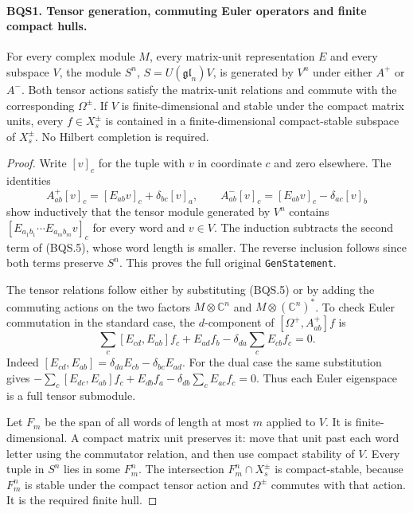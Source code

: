 \documentclass[11pt,a4paper]{article}
\numberwithin{equation}{section}
\theoremstyle{remark}\newtheorem{remark}[theorem]{Remark}
\begin{document}
\paragraph{BQS1. Tensor generation, commuting Euler operators and finite compact hulls.}
\label{claim:BQS1}
For every complex module $M$, every matrix-unit representation $E$ and
every subspace $V$, the module $S^n$, $S=U(\mathfrak{gl}_n)V$, is generated
by $V^n$ under either $A^+$ or $A^-$.  Both tensor actions satisfy the
matrix-unit relations and commute with the corresponding $\Omega^\pm$.
If $V$ is finite-dimensional and stable under the compact matrix units,
every $f\in X_s^\pm$ is contained in a finite-dimensional compact-stable
subspace of $X_s^\pm$.  No Hilbert completion is required.

\begin{proof}
Write $[v]_c$ for the tuple with $v$ in coordinate $c$ and zero elsewhere.
The identities
\[
 A^+_{ab}[v]_c=[E_{ab}v]_c+\delta_{bc}[v]_a,\qquad
 A^-_{ab}[v]_c=[E_{ab}v]_c-\delta_{ac}[v]_b
 \tag{BQS.5}
\]
show inductively that the tensor module generated by $V^n$ contains
$[E_{a_1b_1}\cdots E_{a_mb_m}v]_c$ for every word and $v\in V$.
The induction subtracts the second term of (BQS.5), whose word length
is smaller.  The reverse inclusion follows since both terms preserve
$S^n$.  This proves the full original \texttt{Gen\allowbreak Statement}.

The tensor relations follow either by substituting (BQS.5) or by adding
the commuting actions on the two factors $M\otimes\mathbb C^n$ and
$M\otimes(\mathbb C^n)^*$.  To check Euler commutation in the standard
case, the $d$-component of $[\Omega^+,A^+_{ab}]f$ is
\[
 \sum_c[E_{cd},E_{ab}]f_c+E_{ad}f_b
       -\delta_{da}\sum_cE_{cb}f_c=0.
 \tag{BQS.6}
\]
Indeed $[E_{cd},E_{ab}]=\delta_{da}E_{cb}-\delta_{bc}E_{ad}$.
For the dual case the same substitution gives
$-\sum_c[E_{dc},E_{ab}]f_c+E_{db}f_a
-\delta_{db}\sum_cE_{ac}f_c=0$.
Thus each Euler eigenspace is a full tensor submodule.

Let $F_m$ be the span of all words of length at most $m$ applied to $V$.
It is finite-dimensional.  A compact matrix unit preserves it: move that
unit past each word letter using the commutator relation, and then use
compact stability of $V$.  Every tuple in $S^n$ lies in some $F_m^n$.
The intersection $F_m^n\cap X_s^\pm$ is compact-stable, because
$F_m^n$ is stable under the compact tensor action and $\Omega^\pm$
commutes with that action.  It is the required finite hull.
\end{proof}
\end{document}
